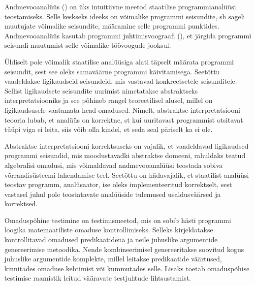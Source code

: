 \documentclass[../thesis.tex]{subfiles}
\begin{document}
Andmevooanalüüs () on üks intuitiivne meetod staatilise programmianalüüsi teostamiseks. Selle keskseks ideeks on võimalike programmi seisundite, sh sageli muutujate võimalike seisundite, määramine selle programmi punktides. Andmevooanalüüs kasutab programmi juhtimisvoograafi (), et järgida programmi seisundi muutumist selle võimalike töövoogude jooksul.

Üldiselt pole võimalik staatilise analüüsiga alati täpselt määrata programmi seisundit, sest see oleks samaväärne programmi käivitamisega. Seetõttu vaadeldakse ligikaudseid seisundeid, mis vastavad konkreetsetele seisunditele. Sellist ligikaudsete seisundite uurimist nimetatakse abstraktseks interpretatsiooniks ja see põhineb rangel teoreetilisel alusel, millel on ligikaudsusele vaatamata head omadused. Nimelt, abstraktse interpretatsiooni teooria lubab, et analüüs on korrektne, st kui uuritavast programmist otsitavat tüüpi viga ei leita, siis võib olla kindel, et seda seal päriselt ka ei ole.

Abstraktse interpretatsiooni korrektsuseks on vajalik, et vaadeldavad ligikaudsed programmi seisundid, mis moodustavadki abstraktse domeeni, rahuldaks teatud algebralisi omadusi, mis võimaldavad andmevooanalüüsi teostada sobiva võrrandisüsteemi lahendamise teel. Seetõttu on hädavajalik, et staatilist analüüsi teostav programm, analüsaator, ise oleks implementeeritud korrektselt, sest vastasel juhul pole teostatavate analüüside tulemused usaldusväärsed ja korrektsed.

Omaduspõhine testimine on testimismeetod, mis on sobib hästi programmi loogika matemaatiliste omaduse kontrollimiseks. Selleks kirjeldatakse kontrollitavad omadused predikaatidena ja neile juhuslike argumentide genereerimise metoodika. Nende kombineerimisel genereeritakse soovitud kogus juhuslike argumentide komplekte, millel leitakse predikaatide väärtused, kinnitades omaduse kehtimist või kummutades selle. Lisaks toetab omaduspõhise testimise raamistik leitud vääravate testjuhtude lihtsustamist.

\end{document}
